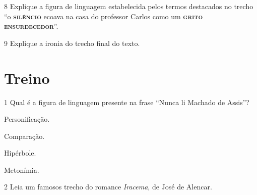 \num{8} Explique a figura de linguagem estabelecida pelos termos destacados no trecho 
``o \textsc{\textbf{silêncio}} ecoava na casa do professor Carlos como um 
\textsc{\textbf{grito ensurdecedor}}''.


\num{9} Explique a ironia do trecho final do texto.


\section*{Treino}

\num{1} Qual é a figura de linguagem presente na frase ``Nunca li Machado de Assis''?

\begin{escolha}

  \item Personificação.
  
  \item Comparação.
  
  \item Hipérbole.
  
  \item Metonímia. 

\end{escolha}

\num{2} Leia um famosos trecho do romance \textit{Iracema}, de José de Alencar.

